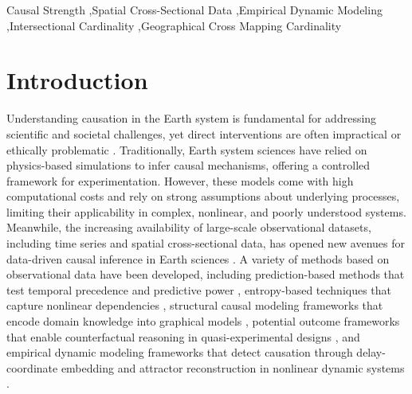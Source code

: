 \documentclass[authoryear,preprint,review,12pt]{elsarticle}
\begin{document}
\begin{frontmatter}
\begin{abstract}
\end{abstract}

\begin{keyword}
Causal Strength \sep Spatial Cross-Sectional Data \sep Empirical Dynamic Modeling \sep Intersectional Cardinality \sep Geographical Cross Mapping Cardinality
\end{keyword}

\end{frontmatter}

\linenumbers

\section{Introduction}

Understanding causation in the Earth system is fundamental for addressing scientific and societal challenges, yet direct interventions are often impractical or ethically problematic \citep{gao2022tscess,runge2023tsc,gao2023gccm}. Traditionally, Earth system sciences have relied on physics-based simulations to infer causal mechanisms, offering a controlled framework for experimentation. However, these models come with high computational costs and rely on strong assumptions about underlying processes, limiting their applicability in complex, nonlinear, and poorly understood systems. Meanwhile, the increasing availability of large-scale observational datasets, including time series and spatial cross-sectional data, has opened new avenues for data-driven causal inference in Earth sciences \citep{runge2019esstsc,runge2023tsc}. A variety of methods based on observational data have been developed, including prediction-based methods that test temporal precedence and predictive power \citep{granger1969grangertest,geweke1982grangertest2}, entropy-based techniques that capture nonlinear dependencies \citep{schreiber2000te1,vicente2010te2,sun2014ce1}, structural causal modeling frameworks that encode domain knowledge into graphical models \citep{pearl2000scm2,pearl2009scm3,pearl2018scm4}, potential outcome frameworks that enable counterfactual reasoning in quasi-experimental designs \citep{rubin1974pom1,rubin1986pom2,rubin2005pom3}, and empirical dynamic modeling frameworks that detect causation through delay-coordinate embedding and attractor reconstruction in nonlinear dynamic systems \citep{sugihara2012ccm,ma2014cms,clark2015multispatialccm}.
\end{document}
